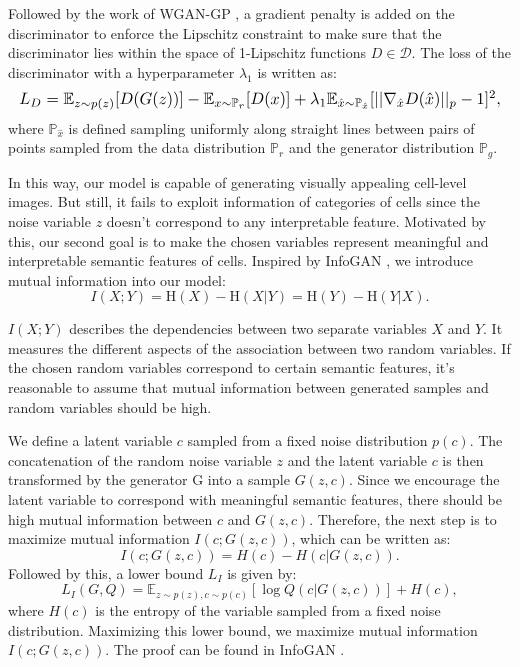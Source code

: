 \documentclass[journal]{IEEEtran}
\begin{document}
Followed by the work of WGAN-GP \cite{gulrajani2017improved}, a gradient penalty is added on the discriminator to enforce the Lipschitz constraint to make sure that the discriminator lies within the space of 1-Lipschitz functions $D\in\mathcal{D}$. The loss of the discriminator with a hyperparameter $\lambda_1$ is written as:
\begin{equation}
\resizebox{1\hsize}{!}{$L_D = \mathbb{E}_{z \sim p(z)} [D(G(z))] - \mathbb{E}_{x \sim \mathbb{P}_r} [D(x)]+ \lambda_1 \mathbb{E}_{\hat x \sim \mathbb{P}_{\hat x}} [ || \nabla_{\hat x} D(\hat x) ||_p - 1 ]^2,$}
\end{equation} where $\mathbb{P}_{\hat x}$ is defined sampling uniformly along straight lines between pairs of points sampled from the data distribution $\mathbb{P}_r$ and the generator distribution $\mathbb{P}_g$. 

In this way, our model is capable of generating visually appealing cell-level images. But still, it fails to exploit information of categories of cells since the noise variable $z$ doesn't correspond to any interpretable feature. Motivated by this, our second goal is to make the chosen variables represent meaningful and interpretable semantic features of cells. Inspired by InfoGAN \cite{chen2016infoGAN}, we introduce mutual information into our model:
\begin{equation}
I(X;Y) = \mathrm {H} (X)-\mathrm {H} (X|Y) = \mathrm {H} (Y) -\mathrm {H} (Y|X).
\label{mutual}
\end{equation}

$I(X;Y)$ describes the dependencies between two separate variables $X$ and $Y$. It measures the different aspects of the association between two random variables. If the chosen random variables correspond to certain semantic features, it's reasonable to assume that mutual information between generated samples and random variables should be high.

We define a latent variable $c$ sampled from a fixed noise distribution $p(c)$. The concatenation of the random noise variable $z$ and the latent variable $c$ is then transformed by the generator G into a sample $G(z,c)$. Since we encourage the latent variable to correspond with meaningful semantic features, there should be high mutual information between $c$ and $G(z, c)$. Therefore, the next step is to maximize mutual information $I(c;G(z,c))$, which can be written as:
\begin{equation}
I(c;G(z,c)) =  H(c) - H(c \vert G(z,c)).
\end{equation} Followed by this, a lower bound $L_I$ is given by:
\begin{equation}
L_I(G, Q) = \mathbb{E}_{z \sim p(z), c \sim p(c)}[\log Q(c \vert G(z,c))] + H(c), 
\end{equation} where $H(c)$ is the entropy of the variable sampled from a fixed noise distribution. Maximizing this lower bound, we maximize mutual information $I(c;G(z,c))$. The proof can be found in InfoGAN \cite{chen2016infoGAN}.
\end{document}
